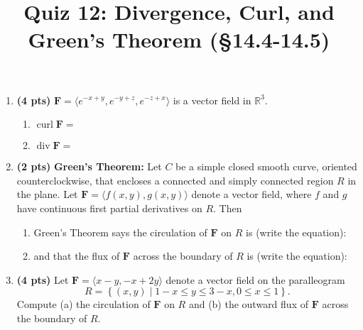 \documentclass[12pt]{article}
\title{\flushleft\vspace{-2pc}\Large
	\bf Quiz 12: Divergence, Curl, and Green's Theorem (\S14.4-14.5)}
\author{}
\date{}
\newcommand{\vect}[1]{\mathbf{#1}}
\DeclareMathOperator{\curl}{curl}
\DeclareMathOperator{\Div}{div}
\begin{document}
\maketitle

\vspace{-3pc}
%
\begin{enumerate}
\item \textbf{(4 pts)} $\vect F=\langle e^{-x+y},e^{-y+z},e^{-z+x}\rangle$ is a vector field in $\mathbb R^3$. %
%
	\begin{enumerate}
	\item $\curl{\vect F}=$
	\vspace{8pc}
	
	\item $\Div{\vect F}=$
	\vspace{8pc}
	\end{enumerate}

\item \textbf{(2 pts)} \textbf{Green's Theorem:} Let $C$ be a simple closed smooth curve, oriented counterclockwise, that encloses a connected and simply connected region $R$ in the plane.  Let $\vect F=\langle f(x,y), g(x,y)\rangle$ denote a vector field, where $f$ and $g$ have continuous first partial derivatives on $R$.  Then
	\begin{enumerate}
	\item Green's Theorem says the circulation of $\vect F$ on $R$ is (write the equation):%
	\vspace{4pc}
	
	\vspace{1pc}
	
	\item and that the flux of $\vect F$ across the boundary of $R$ is (write the equation):%
	\vspace{4pc}
	
	\vspace{1pc}
	\end{enumerate}
\vfill
\newpage

\item \textbf{(4 pts)} Let $\vect{F}=\langle x-y,-x+2y \rangle$ denote a vector field on the paralleogram
\[
R=\left\{(x,y)\mid 1-x\leq y\leq 3-x,0\leq x\leq 1  \right\}.
\]
Compute (a) the circulation of $\vect{F}$ on $R$ and (b) the outward flux of $\vect F$ across the boundary of $R$.  




\end{enumerate}
\end{document}

